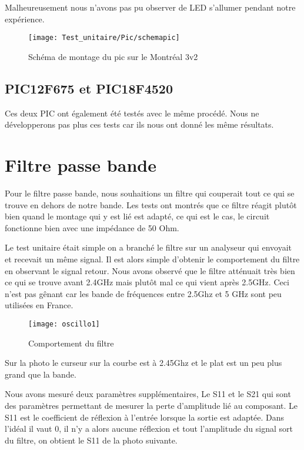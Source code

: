 Malheureusement nous n'avons pas pu observer de LED s'allumer pendant notre expérience.

\begin{figure}[!h]
  \centering
  \texttt{[image: Test\_unitaire/Pic/schemapic]}
  \caption{Schéma de montage du pic sur le Montréal 3v2}
  \label{fig:schemapic}
\end{figure}
\newpage
\subsection{PIC12F675 et PIC18F4520}
\label{sec:picclock}


Ces deux PIC ont également été testés avec le même procédé. Nous ne développerons pas plus ces tests car ils nous ont donné les même résultats.

\section{Filtre passe bande}
\label{sec:passe_bande}


Pour le filtre passe bande, nous souhaitions un filtre qui couperait tout ce qui se trouve en dehors de notre bande. Les tests ont montrés que ce filtre réagit plutôt bien quand le montage qui y est lié est adapté, ce qui est le cas, le circuit fonctionne bien avec une impédance de 50 Ohm.

Le test unitaire était simple on a branché le filtre sur un analyseur qui envoyait et recevait un même signal. Il est alors simple d’obtenir le comportement du filtre en observant le signal retour. Nous avons observé que le filtre atténuait très bien ce qui se trouve avant 2.4GHz mais plutôt mal ce qui vient après 2.5GHz. Ceci n’est pas gênant car les bande de fréquences entre 2.5Ghz et 5 GHz sont peu utilisées en France. 

\begin{figure}[h]
  \centering
  \texttt{[image: oscillo1]}
  \caption{Comportement du filtre}
  \label{fig:comportement}
\end{figure}

Sur la photo le curseur sur la courbe est à 2.45Ghz et le plat est un peu plus grand que la bande.

Nous avons mesuré deux paramètres supplémentaires, Le S11 et le S21 qui sont des paramètres permettant de mesurer la perte d’amplitude lié au composant. Le S11 est le coefficient de réflexion à l'entrée lorsque la sortie est adaptée. Dans l’idéal il vaut 0, il n’y a alors aucune réflexion et tout l’amplitude du signal sort du filtre, on obtient le S11 de la photo suivante.

